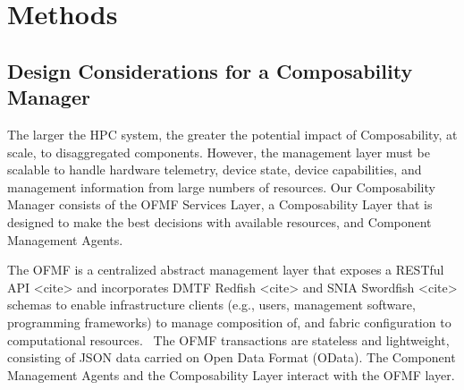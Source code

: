 \section{Methods}

\subsection{Design Considerations for a Composability Manager}

The larger the HPC system, the greater the potential impact of Composability, at scale, to disaggregated components.  However, the management layer must be scalable to handle hardware telemetry, device state, device capabilities, and management information from large numbers of resources. Our Composability Manager consists of the OFMF Services Layer, a Composability Layer that is designed to make the best decisions with available resources, and Component Management Agents.

The OFMF is a centralized abstract management layer that exposes a RESTful API <cite> and incorporates DMTF Redfish <cite> and SNIA Swordfish <cite> schemas to enable infrastructure clients (e.g., users, management software, programming frameworks) to manage composition of, and fabric configuration to computational resources.  The OFMF transactions are stateless and lightweight, consisting of JSON data carried on Open Data Format (OData).  The Component Management Agents and the Composability Layer interact with the OFMF layer.



